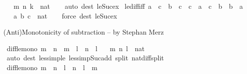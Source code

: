 \begin{isabellebody}
\ \ \ m\ n\ k\ {\isacharcolon}{\kern0pt}{\isacharcolon}{\kern0pt}\ nat\isanewline
%
\isadelimproof
\ \ %
\endisadelimproof
%
\isatagproof
{}\isamarkupfalse%
\ {\isacharparenleft}{\kern0pt}auto\ dest{\isacharbang}{\kern0pt}{\isacharcolon}{\kern0pt}\ le{\isacharunderscore}{\kern0pt}Suc{\isacharunderscore}{\kern0pt}ex{\isacharparenright}{\kern0pt}%
\endisatagproof
{\isafoldproof}%
%
\isadelimproof
\isanewline
%
\endisadelimproof
\isanewline
{}\isamarkupfalse%
\ le{\isacharunderscore}{\kern0pt}diff{\isacharunderscore}{\kern0pt}iff{\isacharprime}{\kern0pt}{\isacharcolon}{\kern0pt}\ {\isachardoublequoteopen}a\ {\isasymle}\ c\ {\isasymLongrightarrow}\ b\ {\isasymle}\ c\ {\isasymLongrightarrow}\ c\ {\isacharminus}{\kern0pt}\ a\ {\isasymle}\ c\ {\isacharminus}{\kern0pt}\ b\ {\isasymlongleftrightarrow}\ b\ {\isasymle}\ a{\isachardoublequoteclose}\isanewline
\ \ \ a\ b\ c\ {\isacharcolon}{\kern0pt}{\isacharcolon}{\kern0pt}\ nat\isanewline
%
\isadelimproof
\ \ %
\endisadelimproof
%
\isatagproof
{}\isamarkupfalse%
\ {\isacharparenleft}{\kern0pt}force\ dest{\isacharcolon}{\kern0pt}\ le{\isacharunderscore}{\kern0pt}Suc{\isacharunderscore}{\kern0pt}ex{\isacharparenright}{\kern0pt}%
\endisatagproof
{\isafoldproof}%
%
\isadelimproof
%
\endisadelimproof
%
\begin{isamarkuptext}%
(Anti)Monotonicity of subtraction -- by Stephan Merz%
\end{isamarkuptext}\isamarkuptrue%
\isamarkupfalse%
\ diff{\isacharunderscore}{\kern0pt}le{\isacharunderscore}{\kern0pt}mono{\isacharcolon}{\kern0pt}\ {\isachardoublequoteopen}m\ {\isasymle}\ n\ {\isasymLongrightarrow}\ m\ {\isacharminus}{\kern0pt}\ l\ {\isasymle}\ n\ {\isacharminus}{\kern0pt}\ l{\isachardoublequoteclose}\isanewline
\ \ \ m\ n\ l\ {\isacharcolon}{\kern0pt}{\isacharcolon}{\kern0pt}\ nat\isanewline
%
\isadelimproof
\ \ %
\endisadelimproof
%
\isatagproof
{}\isamarkupfalse%
\ {\isacharparenleft}{\kern0pt}auto\ dest{\isacharcolon}{\kern0pt}\ less{\isacharunderscore}{\kern0pt}imp{\isacharunderscore}{\kern0pt}le\ less{\isacharunderscore}{\kern0pt}imp{\isacharunderscore}{\kern0pt}Suc{\isacharunderscore}{\kern0pt}add\ split{\isacharcolon}{\kern0pt}\ nat{\isacharunderscore}{\kern0pt}diff{\isacharunderscore}{\kern0pt}split{\isacharparenright}{\kern0pt}%
\endisatagproof
{\isafoldproof}%
%
\isadelimproof
\isanewline
%
\endisadelimproof
\isanewline
{}\isamarkupfalse%
\ diff{\isacharunderscore}{\kern0pt}le{\isacharunderscore}{\kern0pt}mono{}{\isacharcolon}{\kern0pt}\ {\isachardoublequoteopen}m\ {\isasymle}\ n\ {\isasymLongrightarrow}\ l\ {\isacharminus}{\kern0pt}\ n\ {\isasymle}\ l\ {\isacharminus}{\kern0pt}\ m{\isachardoublequoteclose}\isanewline

\end{isabellebody}

